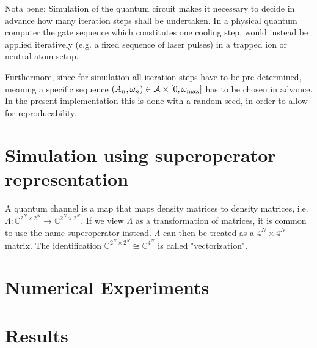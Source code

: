 \documentclass[11pt,a4paper]{article}
\begin{document}
Nota bene: Simulation of the quantum circuit makes it necessary to decide in advance how many iteration steps shall be undertaken. In a physical quantum computer the gate sequence which constitutes one cooling step, would instead be applied iteratively (e.g. a fixed sequence of laser pulses) in a trapped ion or neutral atom setup.

Furthermore, since for simulation all iteration steps have to be pre-determined, meaning a specific sequence $(A_n,\omega_n)\in \mathcal{A}\times [0, \omega_{\rm max}]$ has to be chosen in advance. In the present implementation this is done with a random seed, in order to allow for reproducability.


\section{Simulation using superoperator representation}
A quantum channel is a map that maps density matrices to density matrices, i.e. $\Lambda: \mathbb{C}^{2^N\times 2^N} \to \mathbb{C}^{2^N\times 2^N}$. If we view $\Lambda$ as a transformation of matrices, it is common to use the name superoperator instead. $\Lambda$ can then be treated as a $4^N\times 4^N$ matrix. The identification $\mathbb{C}^{2^N\times 2^N}\cong \mathbb{C}^{4^N}$ is called "vectorization".

\section{Numerical Experiments}

\section{Results}
\end{document}
